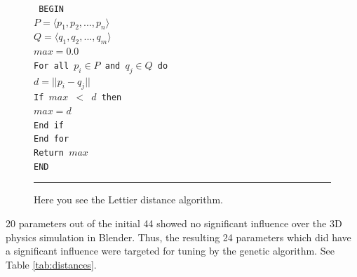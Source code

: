 \begin{figure}[htbp]
\begin{center}
\begin{varwidth}{\textwidth}
{\tt
BEGIN \\
\tab $P = \langle p_1, p_2,...,p_n\rangle$ \\
\tab $Q = \langle q_1, q_2,...,q_m\rangle$ \\
\tab $max = 0.0$ \\
\tab For all $p_i\in P$ and $q_j \in Q$ do \\
\tab \tab $d = ||p_i-q_j||$ \\
\tab \tab If $max$ $<$ $d$ then \\
\tab \tab \tab $max=d$ \\
\tab \tab End if \\
\tab End for \\
\tab Return $max$ \\
END \\
}
\end{varwidth}
\end{center}
\centering
\rule{35em}{0.5pt}
\caption[Lettier Distance Algorithm]{Here you see the Lettier distance algorithm.}
\label{lettierdistance}
\end{figure}

20 parameters out of the initial 44 showed no significant influence over the 3D physics simulation in Blender. Thus, the resulting 24 parameters which did have a significant influence were targeted for tuning by the genetic algorithm. See Table \ref{tab:distances}.

